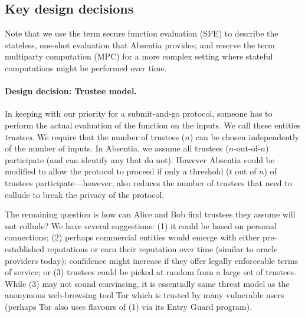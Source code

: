  
\subsection{Key design decisions}

Note that we use the term secure function evaluation (SFE) to describe the stateless, one-shot evaluation that Absentia provides; and reserve the term multiparty computation (MPC) for a more complex setting where stateful computations might be performed over time.

\paragraph{Design decision: Trustee model.} In keeping with our priority for a submit-and-go protocol, someone has to perform the actual evaluation of the function on the inputs. We call these entities \emph{trustees}. We require that the number of trustees ($n$) can be chosen independently of the number of inputs. In Absentia, we assume all trustees ($n$-out-of-$n$) participate (and can identify any that do not). However Absentia could be modified to allow the protocol to proceed if only a threshold ($t$ out of $n$) of trustees participate---however, also reduces the number of trustees that need to collude to break the privacy of the protocol.   

The remaining question is how can Alice and Bob find trustees they assume will not collude? We have several suggestions: (1) it could be based on personal connections; (2) perhaps commercial entities would emerge with either pre-established reputations or earn their reputation over time (similar to oracle providers today); confidence might increase if they offer legally enforceable terms of service; or (3) trustees could be picked at random from a large set of trustees. While (3) may not sound convincing, it is essentially same threat model as the anonymous web-browsing tool Tor which is trusted by many vulnerable users (perhaps Tor also uses flavours of (1) via its Entry Guard program). 

